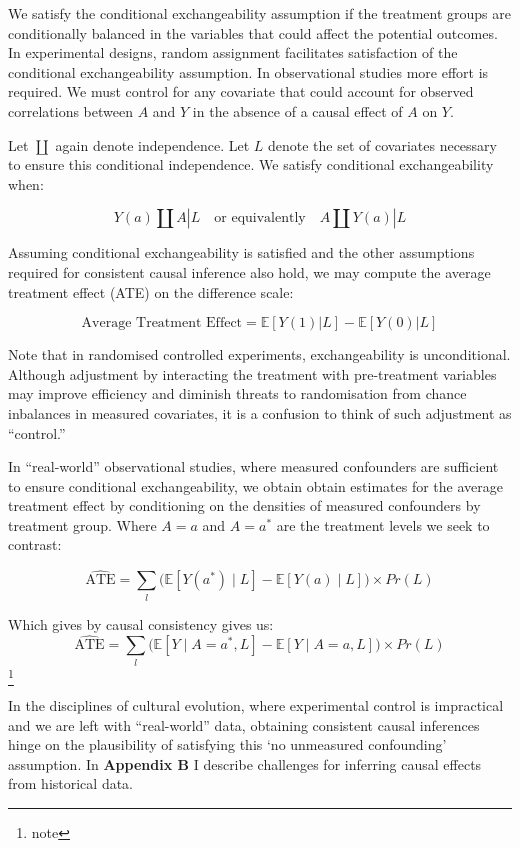 \documentclass[
  single column]{article}
\begin{document}
We satisfy the conditional exchangeability assumption if the treatment
groups are conditionally balanced in the variables that could affect the
potential outcomes. In experimental designs, random assignment
facilitates satisfaction of the conditional exchangeability assumption.
In observational studies more effort is required. We must control for
any covariate that could account for observed correlations between \(A\)
and \(Y\) in the absence of a causal effect of \(A\) on \(Y\).

Let \(\coprod\) again denote independence. Let \(L\) denote the set of
covariates necessary to ensure this conditional independence. We satisfy
conditional exchangeability when:

\[
Y(a) \coprod A | L \quad \text{or equivalently} \quad A \coprod Y(a) | L
\]

Assuming conditional exchangeability is satisfied and the other
assumptions required for consistent causal inference also hold, we may
compute the average treatment effect (ATE) on the difference scale:

\[
\text{Average Treatment Effect} = \mathbb{E}[Y(1) | L] - \mathbb{E}[Y(0) | L]
\]

Note that in randomised controlled experiments, exchangeability is
unconditional. Although adjustment by interacting the treatment with
pre-treatment variables may improve efficiency and diminish threats to
randomisation from chance inbalances in measured covariates, it is a
confusion to think of such adjustment as ``control.''

In ``real-world'' observational studies, where measured confounders are
sufficient to ensure conditional exchangeability, we obtain obtain
estimates for the average treatment effect by conditioning on the
densities of measured confounders by treatment group. Where \(A=a\) and
\(A = a^*\) are the treatment levels we seek to contrast:

\[
\widehat{\text{ATE}} =  \sum_l \big( \mathbb{E}[Y(a^*) \mid L] - \mathbb{E}[Y(a) \mid L] \big) \times Pr(L)
\]

Which gives by causal consistency gives us: \[
\widehat{\text{ATE}} =  \sum_l \big( \mathbb{E}[Y \mid A = a^*, L] - \mathbb{E}[Y \mid A = a, L] \big) \times Pr(L)
\] \footnote{note}

In the disciplines of cultural evolution, where experimental control is
impractical and we are left with ``real-world'' data, obtaining
consistent causal inferences hinge on the plausibility of satisfying
this `no unmeasured confounding' assumption. In \textbf{Appendix B} I
describe challenges for inferring causal effects from historical data.
\end{document}
